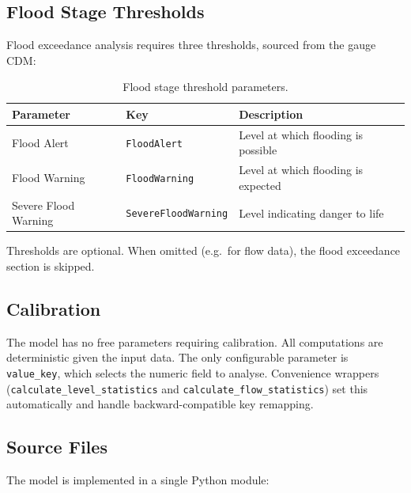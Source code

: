 \documentclass[11pt,a4paper]{article}
\begin{document}
\subsection{Flood Stage Thresholds}

Flood exceedance analysis requires three thresholds, sourced from the gauge CDM:

\begin{table}[H]
\centering
\caption{Flood stage threshold parameters.}
\label{tab:flood_thresholds}
\begin{tabular}{lll}
\toprule
\textbf{Parameter} & \textbf{Key} & \textbf{Description} \\
\midrule
Flood Alert          & \texttt{FloodAlert}          & Level at which flooding is possible \\
Flood Warning        & \texttt{FloodWarning}         & Level at which flooding is expected \\
Severe Flood Warning & \texttt{SevereFloodWarning}   & Level indicating danger to life \\
\bottomrule
\end{tabular}
\end{table}

\noindent Thresholds are optional. When omitted (e.g.\ for flow data), the flood exceedance section is skipped.

\subsection{Calibration}

The model has no free parameters requiring calibration. All computations are deterministic given the input data. The only configurable parameter is \texttt{value\_key}, which selects the numeric field to analyse. Convenience wrappers (\texttt{calculate\_level\_statistics} and \texttt{calculate\_flow\_statistics}) set this automatically and handle backward-compatible key remapping.

\clearpage

\mkmimplementation

\subsection{Source Files}

The model is implemented in a single Python module:
\end{document}
